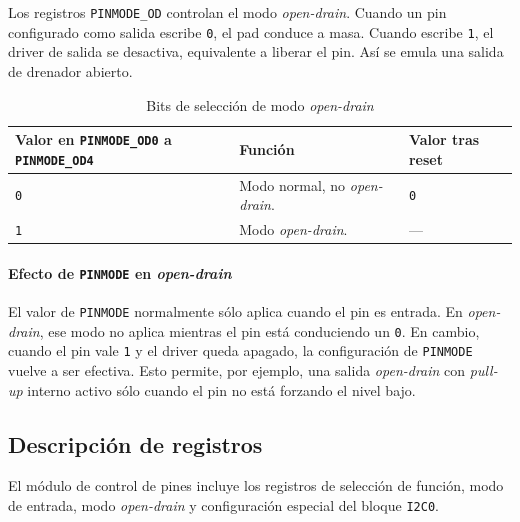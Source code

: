 Los registros \texttt{PINMODE\_OD} controlan el modo \textit{open-drain}. Cuando un pin configurado como salida escribe \texttt{0}, el pad conduce a masa. Cuando escribe \texttt{1}, el driver de salida se desactiva, equivalente a liberar el pin. Así se emula una salida de drenador abierto.

\begin{table}[H]
  \centering
  \small
  \renewcommand{\arraystretch}{1.15}
  \caption{Bits de selección de modo \textit{open-drain}}
  \begin{tabularx}{0.9\textwidth}{|>{\raggedright\arraybackslash}p{}|>{\raggedright\arraybackslash}X|>{\raggedright\arraybackslash}p{}|}
    \hline
    \textbf{Valor en \texttt{PINMODE\_OD0} a \texttt{PINMODE\_OD4}} & \textbf{Función} & \textbf{Valor tras reset} \\
    \hline
    \texttt{0} & Modo normal, no \textit{open-drain}. & \texttt{0} \\
    \hline
    \texttt{1} & Modo \textit{open-drain}. & --- \\
    \hline
  \end{tabularx}
\end{table}

\paragraph{Efecto de \texttt{PINMODE} en \textit{open-drain}}
El valor de \texttt{PINMODE} normalmente sólo aplica cuando el pin es entrada. En \textit{open-drain}, ese modo no aplica mientras el pin está conduciendo un \texttt{0}. En cambio, cuando el pin vale \texttt{1} y el driver queda apagado, la configuración de \texttt{PINMODE} vuelve a ser efectiva. Esto permite, por ejemplo, una salida \textit{open-drain} con \textit{pull-up} interno activo sólo cuando el pin no está forzando el nivel bajo.

\subsection{Descripción de registros}
El módulo de control de pines incluye los registros de selección de función, modo de entrada, modo \textit{open-drain} y configuración especial del bloque \texttt{I2C0}.

